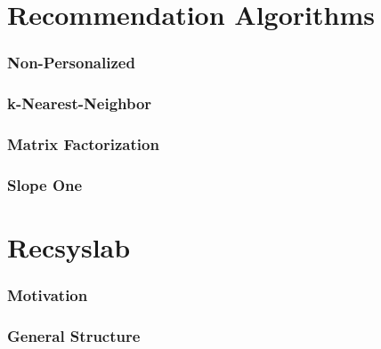 \documentclass{beamer}
\begin{document}
\section{Recommendation Algorithms}
\begin{frame}
\frametitle{Non-Personalized}
\end{frame}
\begin{frame}
\frametitle{k-Nearest-Neighbor}
\end{frame}
\begin{frame}
\frametitle{Matrix Factorization}
\end{frame}
\begin{frame}
\frametitle{Slope One}
\end{frame}

\section{Recsyslab}
\begin{frame} 
\frametitle{Motivation} %
\end{frame}
\begin{frame}
\frametitle{General Structure}
\end{frame}
\end{document}
